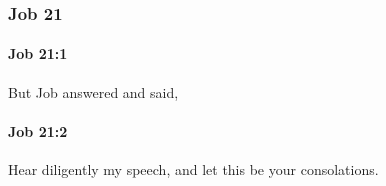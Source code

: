 	\subsubsection{Job 21} %
		\label{JOB-21}

		\paragraph{Job 21:1} %
			\label{JOB-21-1}

			But Job answered and said,


		\paragraph{Job 21:2} %
			\label{JOB-21-2}

			Hear diligently my speech, and let this be your consolations.


